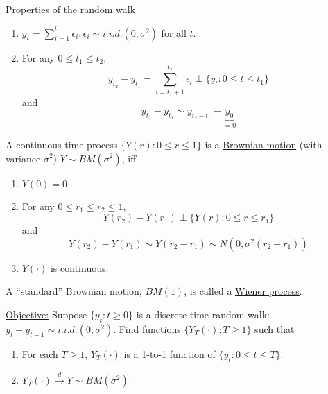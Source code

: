\documentclass[11pt]{elegantbook}
\begin{document}
\begin{lemma}
    Properties of the random walk
    \begin{enumerate}
        \item $y_t=\sum_{i=1}^t\epsilon_{i},\epsilon_i\sim i.i.d. (0,\sigma^2)$ for all $t$.
        \item For any $0\leq t_1\leq t_2$, $$y_{t_2}-y_{t_1}=\sum_{i=t_1+1}^{t_2}\epsilon_i\perp \{y_t:0\leq t\leq t_1\}$$ and $$y_{t_2}-y_{t_1}\sim y_{t_2-t_1}-\underbrace{y_0}_{=0}$$
    \end{enumerate}
\end{lemma}

\begin{definition}
    A continuous time process $\{Y(r):0\leq r\leq 1\}$ is a \underline{Brownian motion} (with variance $\sigma^2$) $Y\sim BM(\sigma^2)$, iff
    \begin{enumerate}
        \item $Y(0)=0$
        \item For any $0\leq r_1\leq r_2\leq 1$, $$Y(r_2)-Y(r_1)\perp\{Y(r):0\leq r\leq r_1\}$$ and $$Y(r_2)-Y(r_1)\sim Y(r_2-r_1) \sim N(0,\sigma^2(r_2-r_1))$$
        \item $Y(\cdot)$ is continuous.
    \end{enumerate}
    \begin{note}
        A ``standard'' Brownian motion, $BM(1)$, is called a \underline{Wiener process}.
    \end{note}
\end{definition}

\underline{Objective:} Suppose $\{y_t:t\geq 0\}$ is a discrete time random walk: $y_t-y_{t-1}\sim i.i.d. (0,\sigma^2)$. Find functions $\{Y_T(\cdot):T\geq 1\}$ such that
\begin{enumerate}
    \item For each $T\geq 1$, $Y_T(\cdot)$ is a 1-to-1 function of $\{y_t:0\leq t\leq T\}$.
    \item $Y_T(\cdot)\stackrel{d}{\longrightarrow} Y\sim BM(\sigma^2)$.
\end{enumerate}
\end{document}
